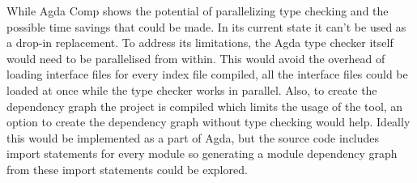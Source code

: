 While Agda Comp shows the potential of parallelizing type checking and the
possible time savings that could be made. In its current state it can't be used
as a drop-in replacement. To address its limitations, the Agda type checker
itself would need to be parallelised from within. This would avoid the overhead
of loading interface files for every index file compiled, all the interface
files could be loaded at once while the type checker works in parallel. Also,
to create the dependency graph the project is compiled which limits the usage
of the tool, an option to create the dependency graph without type checking
would help. Ideally this would be implemented as a part of Agda, but the source
code includes import statements for every module so generating a module
dependency graph from these import statements could be explored.

%
